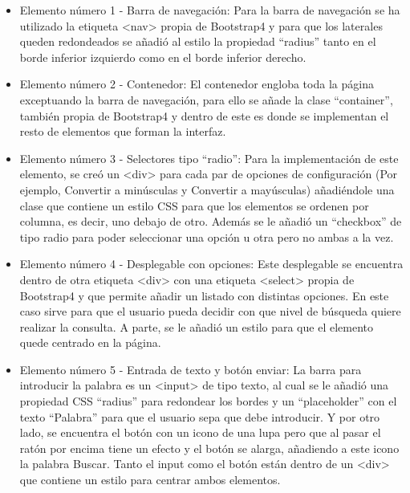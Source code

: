 \begin{itemize}
	\item Elemento número 1 - Barra de navegación: Para la barra de navegación se ha utilizado la etiqueta <nav> propia de Bootstrap4 y para que los laterales queden redondeados se añadió al estilo la propiedad ``radius'' tanto en el borde inferior izquierdo como en el borde inferior derecho.
	\item Elemento número 2 - Contenedor: El contenedor engloba toda la página exceptuando la barra de navegación, para ello se añade la clase ``container'', también propia de Bootstrap4 y dentro de este es donde se implementan el resto de elementos que forman la interfaz.
	\item Elemento número 3 - Selectores tipo ``radio'': Para la implementación de este elemento, se creó un <div> para cada par de opciones de configuración (Por ejemplo, Convertir a minúsculas y Convertir a mayúsculas) añadiéndole una clase que contiene un estilo CSS para que los elementos se ordenen por columna, es decir, uno debajo de otro. Además se le añadió un ``checkbox'' de tipo radio para poder seleccionar una opción u otra pero no ambas a la vez.
	\item Elemento número 4 - Desplegable con opciones: Este desplegable se encuentra dentro de otra etiqueta <div> con una etiqueta <select> propia de Bootstrap4 y que permite añadir un listado con distintas opciones. En este caso sirve para que el usuario pueda decidir con que nivel de búsqueda quiere realizar la consulta. A parte, se le añadió un estilo para que el elemento quede centrado en la página.
	\item Elemento número 5 - Entrada de texto y botón enviar: La barra para introducir la palabra es un <input> de tipo texto, al cual se le añadió una propiedad CSS ``radius'' para redondear los bordes y un ``placeholder'' con el texto ``Palabra'' para que el usuario sepa que debe introducir. Y por otro lado, se encuentra el botón con un icono de una lupa pero que al pasar el ratón por encima tiene un efecto y el botón se alarga, añadiendo a este icono la palabra Buscar.
	Tanto el input como el botón están dentro de un <div> que contiene un estilo para centrar ambos elementos.
\end{itemize}

